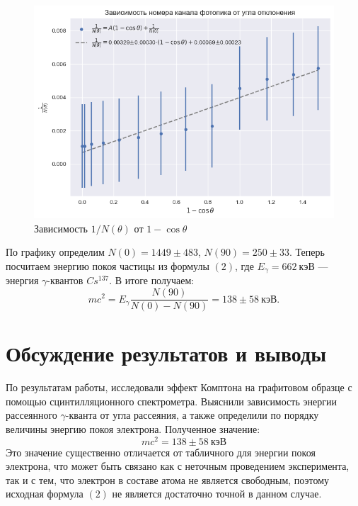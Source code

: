 \documentclass[a4paper, 12pt]{article}
\begin{document}
\begin{figure}[h]
\begin{center}
\includegraphics[width = \textwidth]{plot.png}
\caption{Зависимость $1/N(\theta)$ от $1 - \cos{\theta}$}
\label{fig:plot}
\end{center}
\end{figure}

По графику определим $N(0) = 1449\pm483$, $N(90) = 250\pm33$. Теперь посчитаем энергию покоя частицы из формулы $(2)$, где $E_{\gamma} = 662~кэВ$ --- энергия $\gamma$-квантов $Cs^{137}$. В итоге получаем:
\begin{equation}
mc^2 = E_{\gamma} \frac{N(90)}{N(0) - N(90)} = 138\pm58~кэВ.
\end{equation}

\newpage

\section{Обсуждение результатов и выводы}

По результатам работы, исследовали эффект Комптона на графитовом образце с помощью сцинтилляционного спектрометра. Выяснили зависимость  энергии рассеянного $\gamma$-кванта от угла рассеяния, а также определили по порядку величины энергию покоя электрона. Полученное значение:
\begin{equation}
\boxed{mc^2 = 138\pm58~кэВ}
\end{equation}
Это значение существенно отличается от табличного для энергии покоя электрона, что может быть связано как с неточным проведением эксперимента, так и с тем, что электрон  в составе атома не является свободным, поэтому исходная формула $(2)$ не является достаточно точной в данном случае.
\end{document}
